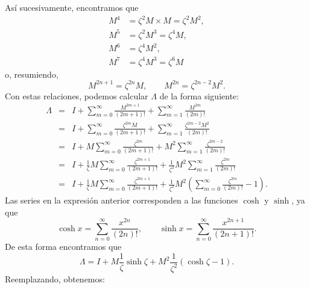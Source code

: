Así sucesivamente, encontramos que
\begin{align}
M^4  &  =\zeta^2 M\times M=\zeta^2 M^2 ,\\
M^{5}  &  =\zeta^2 M^3=\zeta^4 M ,\\
M^{6}  &  =\zeta^4 M^2 ,\\
M^{7}  &  =\zeta^4 M^3=\zeta^{6}M
\end{align}
o, resumiendo,
\begin{equation}
M^{2n+1}   =\zeta^{2n} M, \qquad M^{2n}    =\zeta^{2n-2} M^2.
\end{equation}
Con estas relaciones, podemos calcular $\Lambda$ de la forma siguiente:
\begin{eqnarray}
\Lambda &=& I+\sum_{m=0}^{\infty}\frac{M^{2m+1}}{\left(  2m+1\right)  !}
+\sum_{m=1}^{\infty}\frac{M^{2m}}{\left(  2m\right)  !}\\
&=& I+\sum_{m=0}^{\infty}\frac{\zeta^{2m}M}{\left(  2m+1\right)  !}+\sum
_{m=1}^{\infty}\frac{\zeta^{2m-2}M^2}{\left(  2m\right)  !}\\
&=& I+M\sum_{m=0}^{\infty}\frac{\zeta^{2m}}{\left(  2m+1\right)  !}+M^2
\sum_{m=1}^{\infty}\frac{\zeta^{2m-2}}{\left(  2m\right)  !}\\
&=& I+\frac{1}{\zeta}M\sum_{m=0}^{\infty}\frac{\zeta^{2m+1}}{\left(
2m+1\right)  !}+\frac{1}{\zeta^2}M^2\sum_{m=1}^{\infty}\frac{\zeta^{2m}}{\left(
2m\right)  !}\\
&=& I+\frac{1}{\zeta}M\sum_{m=0}^{\infty}\frac{\zeta^{2m+1}}{\left(
2m+1\right)  !}+\frac{1}{\zeta^2}M^2\left(
\sum_{m=0}^{\infty}\frac{\zeta^{2m}}{\left(  2m\right)  !}-1\right).
\end{eqnarray}
Las series en la expresión anterior corresponden a las funciones $\cosh$ y
$\sinh$, ya que
\begin{equation}
\cosh x =\sum_{n=0}^{\infty}\frac{x^{2n}}{\left(  2n\right)  !}, \qquad
\sinh x =\sum_{n=0}^{\infty}\frac{x^{2n+1}}{\left(  2n+1\right)  !}.
\end{equation}
De esta forma encontramos que
\begin{equation}
\Lambda
=I+M\frac{1}{\zeta}\sinh\zeta+M^2\frac{1}{\zeta^2}\left(\cosh\zeta-1\right).
\end{equation}
Reemplazando, obtenemos:
